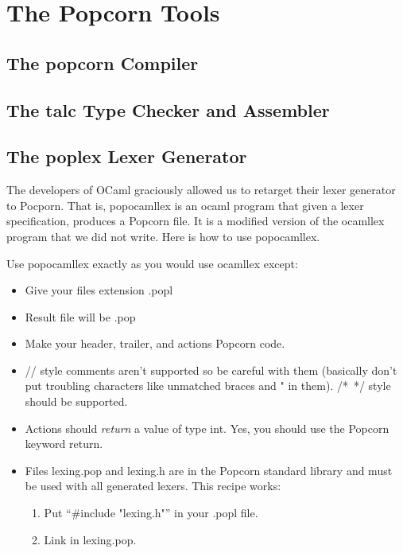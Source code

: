 \documentclass[titlepage,10pt]{article}
\begin{document}
\section{The Popcorn Tools\label{tools}}


\subsection{The popcorn Compiler}


\subsection{The talc Type Checker and Assembler}


\subsection{The poplex Lexer Generator\label{lex}}

The developers of OCaml graciously allowed us to retarget their lexer
generator to Pocporn.  That is, popocamllex is an ocaml program that
given a lexer specification, produces a Popcorn file.  It is a modified
version of the ocamllex program that we did not write.   Here is how to
use popocamllex.

Use popocamllex exactly as you would use ocamllex except: 

\begin{itemize}

\item Give your files extension .popl

\item Result file will be .pop

\item Make your header, trailer, and actions Popcorn code.

\item // style comments aren't supported so be careful with them
(basically don't put troubling characters like unmatched braces and " in
them).  /*~*/ style  should be supported.

\item Actions should \textit{return} a value of type int.  Yes, you
should use the Popcorn keyword return.

\item Files lexing.pop and lexing.h are in the Popcorn standard library
and must be used with all generated lexers.  This recipe works:

    \begin{enumerate}
    \item Put ``\#include "lexing.h"'' in your .popl file.
    \item Link in lexing.pop.
    \end{enumerate}

\end{itemize}
\end{document}
